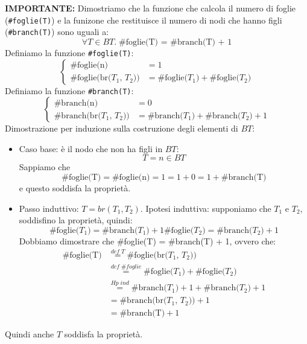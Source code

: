 \documentclass[a4paper]{article}
\begin{document}
\begin{Example}{}{}
\textbf{IMPORTANTE:} Dimostriamo che la funzione che calcola il numero di foglie 
(\texttt{\#foglie(T)}) e la funizone che restituisce il numero di nodi che hanno figli 
(\texttt{\#branch(T)}) sono uguali a:
\[
    \forall T \in BT . \; \text{\#foglie(T) = \#branch(T) + 1}
\]
Definiamo la funzione \texttt{\#foglie(T)}:
\[
\begin{cases}
    \text{\#foglie(n)} & = 1\\
    \text{\#foglie(br($T_1$, $T_2$))} & = \text{\#foglie($T_1$)} + \text{\#foglie($T_2$)}
\end{cases}
\]
Definiamo la funzione \texttt{\#branch(T)}:
\[
\begin{cases}
    \text{\#branch(n)} & = 0\\
    \text{\#branch(br($T_1$, $T_2$))} & = \text{\#branch($T_1$)} + \text{\#branch($T_2$)} + 1
\end{cases}
\]
Dimostrazione per induzione sulla costruzione degli elementi di $BT$:
\begin{itemize}
    \item Caso base: è il nodo che non ha figli in $BT$:
    \[T = n \in BT\]
    Sappiamo che 
    \[
    \text{\#foglie(T)} = \text{\#foglie(n)} = 1 = 1 + 0 =  1 + \text{\#branch(T)}
    \]
    e questo soddisfa la proprietà.
    \item Passo induttivo: $T = br(T_1, T_2)$. Ipotesi induttiva: supponiamo che $T_1$
    e $T_2$, soddisfino la proprietà, quindi:
    \[
    \text{\#foglie($T_1$)} = \text{\#branch($T_1$)} + 1
    \text{\#foglie($T_2$)} = \text{\#branch($T_2$)} + 1
    \]
    Dobbiamo dimostrare che \#foglie(T) = \#branch(T) + 1, ovvero che:
    \[
    \begin{aligned}
    \text{\#foglie(T)} &\stackrel{def \; T}{=} \text{\#foglie(br($T_1$, $T_2$))} \\ 
    & \stackrel{def \; \#foglie}{=} \text{\#foglie($T_1$)} + \text{\#foglie($T_2$)}\\
    & \stackrel{Hp \; ind}{=} \text{\#branch($T_1$)} + 1 + \text{\#branch($T_2$)} + 1\\
    & = \text{\#branch(br($T_1$, $T_2$))} + 1\\
    & = \text{\#branch(T)} + 1
    \end{aligned}
    \]
\end{itemize} 
Quindi anche $T$ soddisfa la proprietà.
\end{Example}
\end{document}
